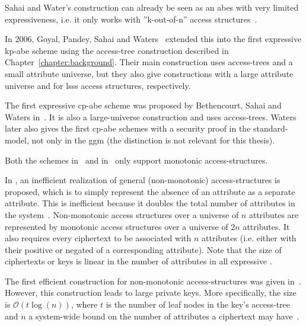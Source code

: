 Sahai and Water's construction can already be seen as an \acrshort{abes} with very limited expressiveness, i.e. it only works with ''k-out-of-n'' access structures~\cite{goyal_attribute-based_2006}.

In 2006, Goyal, Pandey, Sahai and Waters~\cite{goyal_attribute-based_2006} extended this into the first expressive \acrshort{kp-abe} scheme using the \gls{access-tree} construction described in Chapter~\ref{chapter:background}.
Their main construction uses \glspl{access-tree} and a small attribute universe, but they also give constructions with a large attribute universe and for \gls{lsss} access structures, respectively.

The first expressive \acrshort{cp-abe} scheme was proposed by Bethencourt, Sahai and Waters in~\cite{bethencourt_ciphertext-policy_2007}.
It is also a large-universe construction and uses \glspl{access-tree}.
Waters \cite{waters_ciphertext-policy_2011} later also gives the first \acrshort{cp-abe} schemes with a security proof in the \gls{standard-model}, not only in the \gls{ggm} (the distinction is not relevant for this thesis).

Both the schemes in~\cite{goyal_attribute-based_2006} and in~\cite{bethencourt_ciphertext-policy_2007} only support monotonic \glspl{access-structure}.

In \cite{goyal_attribute-based_2006}, an inefficient realization of general (non-monotonic) \glspl{access-structure} is proposed, which is to simply represent the absence of an attribute as a separate attribute.
This is inefficient because it doubles the total number of attributes in the system~\cite{goyal_attribute-based_2006}. 
Non-monotonic access structures over a universe of $n$ attributes are represented by monotonic access structures over a universe of $2n$ attributes.
It also requires every ciphertext to be associated with $n$ attributes (i.e. either with their positive or negated of a corresponding attribute).
Note that the size of ciphertexts or keys is linear in the number of attributes in all expressive . %

The first efficient construction for non-monotonic \glspl{access-structure} was given in~\cite{ostrovsky_attribute-based_2007}. 
However, this construction leads to large private keys.
More specifically, the size is $\mathcal{O}(t \log(n))$, where $t$ is the number of leaf nodes in the key's \gls{access-tree} and $n$ a system-wide bound on the number of attributes a ciphertext may have~\cite{lewko_revocation_2008}. %

